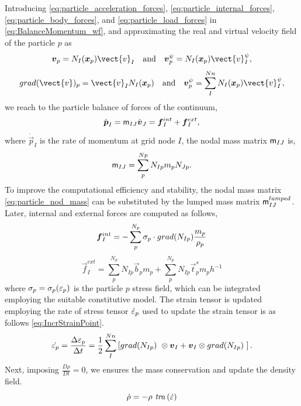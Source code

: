 Introducing \eqref{eq:particle_acceleration_forces},
\eqref{eq:particle_internal_forces}, \eqref{eq:particle_body_forces}, 
and \eqref{eq:particle_load_forces} in \eqref{eq:BalanceMomentum_wf},
and approximating the real and virtual velocity  field of the particle
$p$ as
\begin{equation}
  \label{eq:Approx-velocity-mesh}
  \vec{v}_{p} = N_I(\vec{x}_p) \vect{v}_I
  \quad \text{and} \quad \vec{v}^{\psi}_{p} = N_I(\vec{x}_p) \vect{v}_I^{\psi},
\end{equation}
\begin{equation}
  \label{eq:Approx-gradvelocity-mesh}
  \Grad{\vect{v}}_p = \vect{v}_I N_I(\vec{x}_p)
  \quad \text{and} \quad \vec{v}^{\psi}_{p} = \sum^{Nn}_I N_I(\vec{x}_p) \vect{v}_I^{\psi},
\end{equation}
we reach to the particle balance of forces of the continuum,
\begin{equation}
  \label{eq:particle_balance_forces3}
  \dot{\vec{p}}_{I}= \tens{m}_{IJ}\dot{\vec{v}}_{J} = \vec{f}_{I}^{int} + \vec{f}_{I}^{ext},
\end{equation}
where $\dot{\vec{p}}_{I}$ is the rate of momentum at grid node $I$, the nodal mass matrix $\mathsf{m}_{IJ}$ is,
\begin{equation}
  \label{eq:particle_nod_mass}
  \mathsf{m}_{IJ} =
  \sum^{Np}_{p} N_{Ip} m_p N_{Jp}.
\end{equation}
To improve the computational efficiency and stability, the nodal mass matrix
\eqref{eq:particle_nod_mass} can be substituted by the lumped mass
matrix $\mathsf{m}_{IJ}^{lumped}$.
Later, internal and external forces are computed as follows,
\begin{equation}
  \label{eq:nodal_internal_forces}
  \vec{f}_{I}^{int} = - \sum^{N_p}_{p} \tens{\sigma}_{p} \cdot \Grad{N_{Ip}} \frac{m_p}{\rho_p}
\end{equation}
\begin{equation}
  \label{eq:nodal_external_forces}
  \vec{f}_{I}^{ext} = \sum^{N_p}_{p} N_{Ip} \vec{b}_{p} m_p  + \sum^{N_p}_{p}
  N_{Ip} \vec{t}^s_{p} m_p h^{-1} 
\end{equation}
where $\mathsf{\sigma}_{p} = \mathsf{\sigma}_{p}(\mathsf{\varepsilon}_{p})$
is the particle $p$ stress field, which can be integrated employing
the suitable constitutive model. The strain tensor is updated employing the rate of stress tensor $\dot{ \mathsf{\varepsilon}}_{p}$ used to update the
strain tensor is as follows \eqref{eq:IncrStrainPoint}.
\begin{equation}
  \label{eq:IncrStrainPoint}
  \dot{\tens{\varepsilon}_{p}} = \frac{\Delta
    \tens{\varepsilon}_{p}}{\Delta t} =
  \frac{1}{2} \sum^{Nn}_I \left[\Grad{N_{Ip}}\ \otimes \vec{v}_{I} + \vec{v}_{I} \otimes
    \Grad{N_{Ip}}\ \right].
\end{equation}
Next, imposing $\frac{D \rho}{D t} = 0$, we ensures the mass
conservation and update the density field.
\begin{equation}
  \label{eq:MassConservation}
\dot{\rho} = - \rho\ \mathit{tra} \left( \dot{\mathsf{\varepsilon}} \right)
\end{equation}

